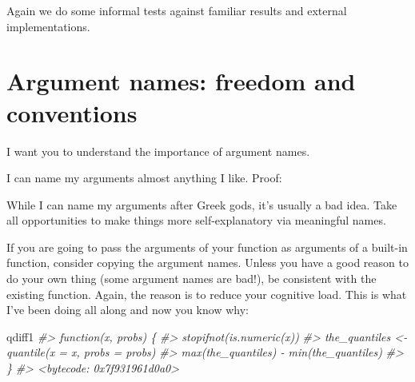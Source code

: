 \documentclass[
]{book}
\newenvironment{Shaded}{\begin{snugshade}}{\end{snugshade}}
\newcommand{\CommentTok}[1]{\textcolor[rgb]{0.56,0.35,0.01}{\textit{#1}}}
\newcommand{\ControlFlowTok}[1]{\textcolor[rgb]{0.13,0.29,0.53}{\textbf{#1}}}
\newcommand{\DataTypeTok}[1]{\textcolor[rgb]{0.13,0.29,0.53}{#1}}
\newcommand{\DecValTok}[1]{\textcolor[rgb]{0.00,0.00,0.81}{#1}}
\newcommand{\KeywordTok}[1]{\textcolor[rgb]{0.13,0.29,0.53}{\textbf{#1}}}
\newcommand{\NormalTok}[1]{#1}
\newcommand{\OperatorTok}[1]{\textcolor[rgb]{0.81,0.36,0.00}{\textbf{#1}}}
\newcommand{\StringTok}[1]{\textcolor[rgb]{0.31,0.60,0.02}{#1}}
\begin{document}
Again we do some informal tests against familiar results and external implementations.

\hypertarget{argument-names-freedom-and-conventions}{%
\section{Argument names: freedom and conventions}\label{argument-names-freedom-and-conventions}}

I want you to understand the importance of argument names.

I can name my arguments almost anything I like. Proof:

\begin{Shaded}
\end{Shaded}

While I can name my arguments after Greek gods, it's usually a bad idea. Take all opportunities to make things more self-explanatory via meaningful names.

If you are going to pass the arguments of your function as arguments of a built-in function, consider copying the argument names. Unless you have a good reason to do your own thing (some argument names are bad!), be consistent with the existing function. Again, the reason is to reduce your cognitive load. This is what I've been doing all along and now you know why:

\begin{Shaded}
\begin{Highlighting}[]
\NormalTok{qdiff1}
\CommentTok{#> function(x, probs) \{}
\CommentTok{#>   stopifnot(is.numeric(x))}
\CommentTok{#>   the_quantiles <- quantile(x = x, probs = probs)}
\CommentTok{#>   max(the_quantiles) - min(the_quantiles)}
\CommentTok{#> \}}
\CommentTok{#> <bytecode: 0x7f931961d0a0>}
\end{Highlighting}
\end{Shaded}
\end{document}
